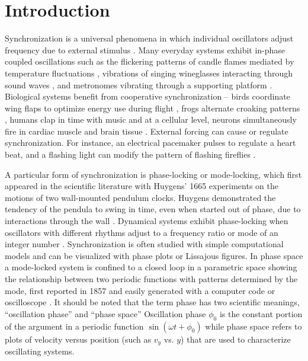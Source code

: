 \documentclass[twocolumn,preprintnumbers,amsmath,amssymb,aps,prx]{revtex4}
\begin{document}
\section{Introduction} %
%
Synchronization is a universal phenomena
in which individual oscillators adjust frequency due
to external stimulus \cite{Pikovsky2003}.
Many everyday systems
exhibit in-phase coupled oscillations %
such as the
flickering patterns of
candle flames mediated by temperature fluctuations \cite{Okamoto2016},
vibrations of singing wineglasses interacting 
through sound waves \cite{Arane2009}, 
and metronomes vibrating through a supporting platform \cite{Jia2015}.
Biological systems benefit from cooperative
synchronization -- %
birds coordinate wing flaps
to optimize energy use during flight \cite{Portugal2014},
frogs alternate croaking patterns \cite{Aihara2014},
humans clap in time with music \cite{Tranchant2016}
and 
at a cellular level, 
neurons simultaneously fire in cardiac muscle \cite{MartinHall1999}
and brain tissue \cite{Singer1999}.
External forcing can cause or regulate 
synchronization. %
For instance,
an electrical pacemaker %
pulses to regulate a heart beat,
and 
a flashing light can modify the
pattern of flashing fireflies .%

A particular form of 
synchronization is phase-locking or mode-locking,
which first appeared in the scientific literature
with 
Huygens' 1665 experiments on
the 
motions of two wall-mounted pendulum clocks.
Huygens demonstrated the tendency of
the pendula 
to swing in time, 
even when started out of phase,
due to interactions through the wall \cite{Bennett2002}.
Dynamical systems %
exhibit phase-locking 
when oscillators with different rhythms adjust %
to a frequency ratio or mode 
of an integer number \cite{Bak1986}.
Synchronization 
is often studied with simple computational models
and can be visualized 
with phase
plots or Lissajous figures.
In phase space 
a mode-locked system is confined to 
a closed loop in a 
parametric space showing the relationship between two periodic functions
with patterns determined by the mode, %
first reported in 1857 \cite{Lissajous1857}
and easily generated with a computer code 
or oscilloscope \cite{Tong1997}. 
It should be noted that the term phase
has two scientific meanings, 
``oscillation phase'' and ``phase space''
Oscillation phase $\phi_0$ is the constant portion of the argument in a periodic function
  $\sin{(\omega t + \phi_0)}$ while phase space refers
  to plots of velocity versus position (such as $v_y$ vs. $y$)
  that are used to characterize oscillating systems.
\end{document}
